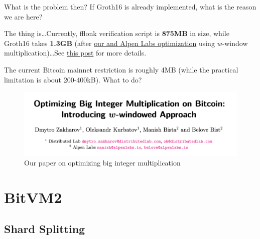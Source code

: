 \documentclass{zkdl-presentation-template}
\begin{document}
    \begin{frame}{What is the problem then?}
        If Groth16 is already implemented, what is the reason we are here?

        The thing is\ldots Currently, fflonk verification script is \textbf{875MB} in size, while Groth16 takes \textbf{1.3GB} (after \href{https://eprint.iacr.org/2024/1236}{\textcolor{blue!70!white}{our and Alpen Labs optimization}} using $w$-window multiplication)\ldots See \href{https://x.com/fiamma_chain/status/1830824142826086608?s=46}{\textcolor{blue!70!white}{this post}} for more details.

        The current Bitcoin mainnet restriction is roughly 4MB (while the practical limitation is about 200-400kB). What to do?

        \begin{figure}
            \centering
            \includegraphics[width=\linewidth]{images/w_mul.png}
            \caption{Our paper on optimizing big integer multiplication}
            \label{fig:w_mul}
        \end{figure}
    \end{frame}

    \section{BitVM2}

    \subsection{Shard Splitting}
\end{document}
